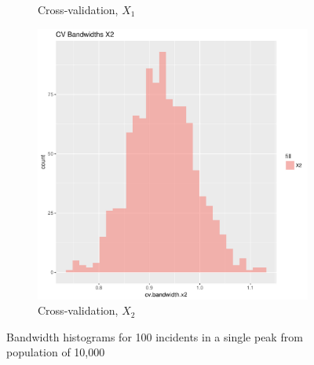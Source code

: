 \begin{figure}[htbp]
\begin{subfigure}[b]{0.3\textwidth}
    \caption{Cross-validation, \(X_1\)}
    \label{fig:bandwidths_x1:unif_100_1_1h:x1}
    \end{subfigure}
    \begin{subfigure}[b]{0.3\textwidth}
    \includegraphics[width=\textwidth]{results/unif_100_1_1h/output/bandwidths-x2}
    \caption{Cross-validation, \(X_2\)}
    \label{fig:bandwidths_x1:unif_100_1_1h:x2}
    \end{subfigure}
    \caption{Bandwidth histograms for 100 incidents in a single peak from population of 10,000}
\end{figure}


